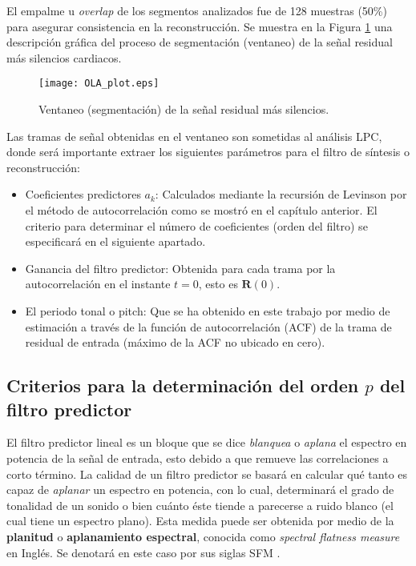 El empalme u \emph{overlap} de los segmentos analizados fue de 128 muestras (50\%) para asegurar consistencia en la reconstrucción. Se muestra en la Figura \ref{windowing} una descripción gráfica del proceso de segmentación (ventaneo) de la señal residual más silencios cardiacos. 
\begin{figure}[ht]
  \centering
  \texttt{[image: OLA\_plot.eps]}
  \caption{Ventaneo (segmentación) de la señal residual más silencios.}
  \label{windowing}
\end{figure}

 Las tramas de señal obtenidas en el ventaneo son sometidas al análisis LPC, donde será importante extraer los siguientes parámetros para el filtro de síntesis o reconstrucción:
 \begin{itemize}
 	\item Coeficientes predictores $a_{k}$: Calculados mediante la recursión de Levinson por el método de autocorrelación como se mostró en el 			capítulo anterior. El criterio para determinar el número de coeficientes (orden del filtro) se especificará en el siguiente apartado.
	\item Ganancia del filtro predictor: Obtenida para cada trama por la autocorrelación en el instante $t=0$, esto es $\textbf{R}(0)$.
	\item El periodo tonal o pitch: Que se ha obtenido en este trabajo por medio de estimación a través de la función de autocorrelación (ACF) de la 			trama de residual de entrada (máximo de la ACF no ubicado en cero).
 \end{itemize}
 \subsection{Criterios para la determinación del orden $p$ del filtro predictor}
 El filtro predictor lineal es un bloque que se dice \emph{blanquea} o \emph{aplana} el espectro en potencia de la señal de entrada, esto debido a que remueve las correlaciones a corto término.
 La calidad de un filtro predictor se basará en calcular qué tanto es capaz de \emph{aplanar} un espectro en potencia, con lo cual, determinará el grado de tonalidad de un sonido o bien cuánto éste tiende a parecerse a ruido blanco (el cual tiene un espectro plano). Esta medida puede ser obtenida por medio de la \textbf{planitud} o \textbf{aplanamiento espectral}, conocida como \emph{spectral flatness measure} en Inglés. Se denotará en este caso por sus siglas SFM \cite[]{Jayant1974}.
 

